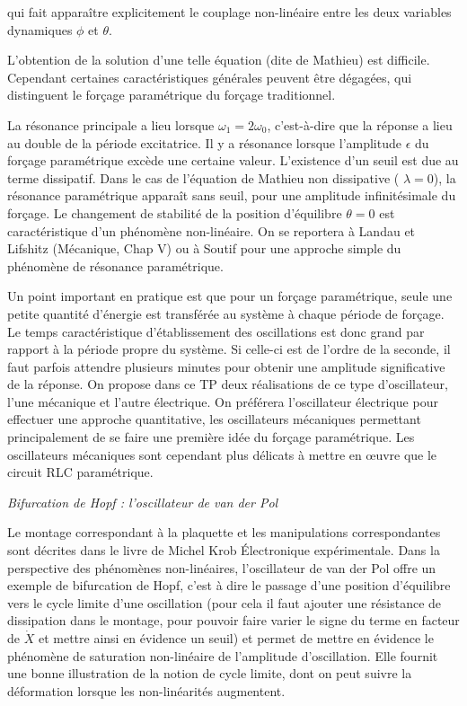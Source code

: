 \documentclass{article}%
\begin{document}
qui fait apparaître explicitement le couplage non-linéaire entre les deux variables dynamiques $\phi$ et $\theta$.

L'obtention de la solution d'une telle équation (dite de Mathieu) est difficile. Cependant certaines caractéristiques générales peuvent être dégagées, qui distinguent le forçage paramétrique du forçage traditionnel.

La résonance principale a lieu lorsque $\omega_1 = 2 \omega_0$, c'est-à-dire que la réponse a lieu au double de la période excitatrice. Il y a résonance lorsque l'amplitude $\epsilon$ du forçage paramétrique excède une certaine valeur. L'existence d'un seuil est due au terme dissipatif. Dans le cas de l'équation de Mathieu non dissipative ( $\lambda = 0$), la résonance paramétrique apparaît sans seuil, pour une amplitude infinitésimale du forçage. Le changement de stabilité de la position d'équilibre $\theta = 0$ est caractéristique d'un phénomène non-linéaire. On se reportera à Landau et Lifshitz (Mécanique, Chap V) ou à Soutif pour une approche simple du phénomène de résonance paramétrique.

Un point important en pratique est que pour un forçage paramétrique, seule une petite quantité d'énergie est transférée au système à chaque période de forçage. Le temps caractéristique d'établissement des oscillations est donc grand par rapport à la période propre du système. Si celle-ci est de l'ordre de la seconde, il faut parfois attendre plusieurs minutes pour obtenir une amplitude significative de la réponse. On propose dans ce TP deux réalisations de ce type d'oscillateur, l'une mécanique et l'autre électrique. On préférera l'oscillateur électrique pour effectuer une approche quantitative, les oscillateurs mécaniques permettant principalement de se faire une première idée du forçage paramétrique. Les oscillateurs mécaniques sont cependant plus délicats à mettre en œuvre que le circuit RLC paramétrique.

\textit{Bifurcation de Hopf : l'oscillateur de van der Pol}

Le montage correspondant à la plaquette et les manipulations correspondantes sont décrites dans le livre de Michel Krob Électronique expérimentale. Dans la perspective des phénomènes non-linéaires, l'oscillateur de van der Pol offre un exemple de bifurcation de Hopf, c'est à dire le passage d'une position d'équilibre vers le cycle limite d'une oscillation (pour cela il faut ajouter une résistance de dissipation dans le montage, pour pouvoir faire varier le signe du terme en facteur de $\dot X$ et mettre ainsi en évidence un seuil) et permet de mettre en évidence le phénomène de saturation non-linéaire de l'amplitude d'oscillation. Elle fournit une bonne illustration de la notion de cycle limite, dont on peut suivre la déformation lorsque les non-linéarités augmentent.
\end{document}

